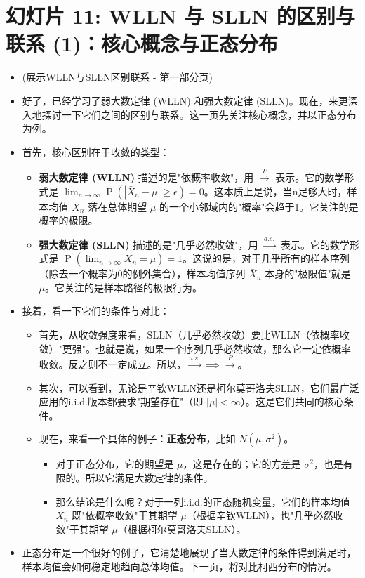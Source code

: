 \documentclass[UTF8]{article} %
\DeclareMathOperator{\Prob}{\operatorname{P}}
\begin{document}
\section*{幻灯片 11: WLLN 与 SLLN 的区别与联系 (1)：核心概念与正态分布}
\begin{itemize}
    \itemsep1em
    \item (展示WLLN与SLLN区别联系 - 第一部分页)
    \item 好了，已经学习了弱大数定律 (WLLN) 和强大数定律 (SLLN)。现在，来更深入地探讨一下它们之间的区别与联系。这一页先关注核心概念，并以正态分布为例。
    \item 首先，核心区别在于收敛的类型：
    \begin{itemize}[label=\textbullet, itemsep=0.3em]
        \item \textbf{弱大数定律 (WLLN)} 描述的是"依概率收敛"，用 $\xrightarrow{P}$ 表示。它的数学形式是 $\lim_{n \to \infty} \Prob(|\bar{X}_n - \mu| \geq \epsilon) = 0$。这本质上是说，当n足够大时，样本均值 $\bar{X}_n$ 落在总体期望 $\mu$ 的一个小邻域内的"概率"会趋于1。它关注的是概率的极限。
        \item \textbf{强大数定律 (SLLN)} 描述的是"几乎必然收敛"，用 $\xrightarrow{a.s.}$ 表示。它的数学形式是 $\Prob(\lim_{n \to \infty} \bar{X}_n = \mu) = 1$。这说的是，对于几乎所有的样本序列（除去一个概率为0的例外集合），样本均值序列 $\bar{X}_n$ 本身的"极限值"就是 $\mu$。它关注的是样本路径的极限行为。
    \end{itemize}
    \item 接着，看一下它们的条件与对比：
    \begin{itemize}[label=\textbullet, itemsep=0.3em]
        \item 首先，从收敛强度来看，SLLN（几乎必然收敛）要比WLLN（依概率收敛）"更强"。也就是说，如果一个序列几乎必然收敛，那么它一定依概率收敛。反之则不一定成立。所以，$\xrightarrow{a.s.} \implies \xrightarrow{P}$。
        \item 其次，可以看到，无论是辛钦WLLN还是柯尔莫哥洛夫SLLN，它们最广泛应用的i.i.d.版本都要求"期望存在"（即 $|\mu| < \infty$）。这是它们共同的核心条件。
        \item 现在，来看一个具体的例子：\textbf{正态分布}，比如 $N(\mu, \sigma^2)$。
            \begin{itemize}[label=\textbullet, itemsep=0.2em]
                \item 对于正态分布，它的期望是 $\mu$，这是存在的；它的方差是 $\sigma^2$，也是有限的。所以它满足大数定律的条件。
                \item 那么结论是什么呢？对于一列i.i.d.的正态随机变量，它们的样本均值 $\bar{X}_n$ 既"依概率收敛"于其期望 $\mu$（根据辛钦WLLN），也"几乎必然收敛"于其期望 $\mu$（根据柯尔莫哥洛夫SLLN）。
            \end{itemize}
    \end{itemize}
    \item 正态分布是一个很好的例子，它清楚地展现了当大数定律的条件得到满足时，样本均值会如何稳定地趋向总体均值。下一页，将对比柯西分布的情况。
\end{itemize}
\end{document}
